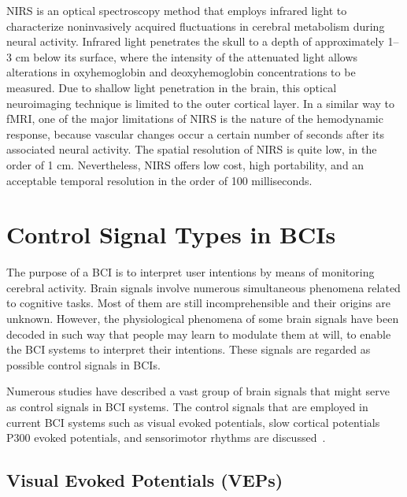 NIRS is an optical spectroscopy method that employs infrared light to characterize noninvasively acquired fluctuations in cerebral metabolism during neural activity. Infrared light penetrates the skull to a depth of approximately 1–3 cm below its surface, where the intensity of the attenuated light allows alterations in oxyhemoglobin and deoxyhemoglobin concentrations to be measured. Due to shallow light penetration in the brain, this optical neuroimaging technique is limited to the outer cortical layer. In a similar way to fMRI, one of the major limitations of NIRS is the nature of the hemodynamic response, because vascular changes occur a certain number of seconds after its associated neural activity. The spatial resolution of NIRS is quite low, in the order of 1 cm. Nevertheless, NIRS offers low cost, high portability, and an acceptable temporal resolution in the order of 100 milliseconds.

\section{Control Signal Types in BCIs}\label{ch2:5}

The purpose of a BCI is to interpret user intentions by means of monitoring cerebral activity. Brain signals involve numerous simultaneous phenomena related to cognitive tasks. Most of them are still incomprehensible and their origins are unknown. However, the physiological phenomena of some brain signals have been decoded in such way that people may learn to modulate them at will, to enable the BCI systems to interpret their intentions. These signals are regarded as possible control signals in BCIs.

Numerous studies have described a vast group of brain signals that might serve as control signals in BCI systems. The control signals that are employed in current BCI systems such as visual evoked potentials, slow cortical potentials P300 evoked potentials, and sensorimotor rhythms are discussed~\cite{6}.

\subsection{Visual Evoked Potentials (VEPs)}\label{ch2:5}

